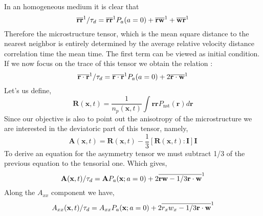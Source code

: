 In an homogeneous medium it is clear that 
\begin{equation*} 
    \overline{\textbf{rr}}^{1} /\tau_d
    =  
    \overline{\textbf{rr}}^{1} P_a(a = 0)
    + \overline{\textbf{rw}}^{1} 
    + \overline{\textbf{wr}}^{1} 
\end{equation*}
Therefore the microstructure tensor, which is the mean square distance to the nearest neighbor is entirely determined by the average relative velocity distance correlation time the mean time. 
The first term can be viewed as initial condition. 
If we now focus on the trace of this tensor we obtain the relation : 
\begin{equation*} 
    \overline{\textbf{r}\cdot \textbf{r}}^{1} /\tau_d
    =  
    \overline{\textbf{r}\cdot \textbf{r}}^{1} P_a( a = 0)
    + 2\overline{\textbf{r}\cdot \textbf{w}}^{1}
\end{equation*}
Let's us define, 
\begin{equation*}
    \textbf{R}(\textbf{x},t) =\frac{1}{n_p(\textbf{x},t)} \int \textbf{rr} P_\text{nst}(\textbf{r}) d\textbf{r}
\end{equation*}
Since our objective is also to point out the anisotropy of the microstructure we are interested in the deviatoric part of this tensor, namely, 
\begin{equation*}
    \textbf{A}(\textbf{x},t) = \textbf{R}(\textbf{x},t) - \frac{1}{3} [\textbf{R}(\textbf{x},t) : \textbf{I}] \textbf{I}
\end{equation*}
To derive an equation for the asymmetry tensor we must subtract 1/3 of the previous equation to the tensorial one. 
Which gives, 
\begin{equation*} 
    \textbf{A}(\textbf{x},t)/\tau_d
    =  
    \textbf{A} P_a(\textbf{x}; a = 0)
    + 2\overline{\textbf{rw} - 1/3\textbf{r}\cdot \textbf{w}}^{1} 
\end{equation*}
Along the $A_{xx}$ component we have, 
\begin{equation*} 
    A_{xx}(\textbf{x},t)/\tau_d
    =  
    A_{xx} P_a(\textbf{x}; a = 0)
    + 2\overline{r_xw_x - 1/3\textbf{r}\cdot \textbf{w}}^{1}
\end{equation*}

